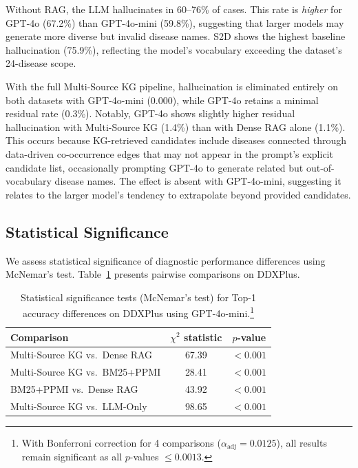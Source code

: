 \documentclass[preprint,12pt]{elsarticle}
\begin{document}
Without RAG, the LLM hallucinates in 60--76\% of cases. This rate is \emph{higher} for GPT-4o (67.2\%) than GPT-4o-mini (59.8\%), suggesting that larger models may generate more diverse but invalid disease names. S2D shows the highest baseline hallucination (75.9\%), reflecting the model's vocabulary exceeding the dataset's 24-disease scope. 

With the full Multi-Source KG pipeline, hallucination is eliminated entirely on both datasets with GPT-4o-mini (0.000), while GPT-4o retains a minimal residual rate (0.3\%). Notably, GPT-4o shows slightly higher residual hallucination with Multi-Source KG (1.4\%) than with Dense RAG alone (1.1\%). This occurs because KG-retrieved candidates include diseases connected through data-driven co-occurrence edges that may not appear in the prompt's explicit candidate list, occasionally prompting GPT-4o to generate related but out-of-vocabulary disease names. The effect is absent with GPT-4o-mini, suggesting it relates to the larger model's tendency to extrapolate beyond provided candidates.

\subsection{Statistical Significance}

We assess statistical significance of diagnostic performance differences using McNemar's test. Table~\ref{tab:significance} presents pairwise comparisons on DDXPlus.

\begin{table}[t]
\centering
\caption{Statistical significance tests (McNemar's test) for Top-1 accuracy differences on DDXPlus using GPT-4o-mini.\footnote{With Bonferroni correction for 4 comparisons ($\alpha_{\text{adj}} = 0.0125$), all results remain significant as all $p$-values $\leq 0.0013$.}}
\label{tab:significance}
\begin{tabular}{lcc}
\toprule
\textbf{Comparison} & \textbf{$\chi^2$ statistic} & \textbf{$p$-value} \\
\midrule
Multi-Source KG vs.\ Dense RAG        & 67.39 & $< 0.001$ \\
Multi-Source KG vs.\ BM25+PPMI        & 28.41 & $< 0.001$ \\
BM25+PPMI vs.\ Dense RAG               & 43.92 & $< 0.001$ \\
Multi-Source KG vs.\ LLM-Only          & 98.65 & $< 0.001$ \\
\bottomrule
\end{tabular}
\end{table}
\end{document}
